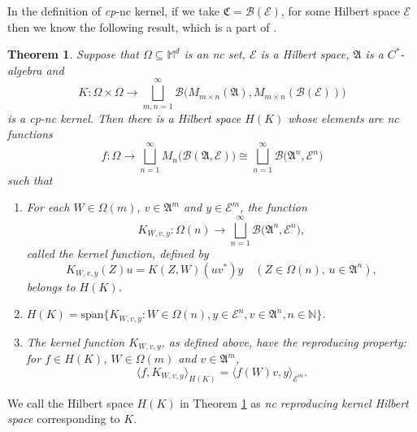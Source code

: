 \documentclass[12pt]{amsart}%
\newtheorem{theorem}{Theorem}[section]
\numberwithin{equation}{section}
\newcommand{\cB}{\mathcal{B}}
\newcommand{\cE}{\mathcal{E}}
\newcommand{\bM}{\mathbb{M}}
\newcommand{\bN}{\mathbb{N}}
\newcommand{\fA}{{\mathfrak{A}}}
\newcommand{\fC}{{\mathfrak{C}}}
\newcommand{\clb}{\mathcal{B}}
\begin{document}
In the definition of \textit{cp}-nc kernel, if we take $\fC=\clb(\cE)$, for some Hilbert space $\cE$ then we know the following result, which is a part of \cite[Theorem 3.1]{BMV16}.
\begin{theorem}\label{rkhs}
    Suppose that $\Omega\subseteq \bM^d$ is an nc set, $\cE$ is a Hilbert space, $\fA$ is a $C^*$-algebra and 
    \[
    K:\Omega\times\Omega\to\bigsqcup_{m,n=1}^{\infty} \cB\big(M_{m\times n}(\fA), M_{m\times n}(\cB(\cE))\big) 
    \]
    is a \textit{cp}-nc kernel. Then there is a Hilbert space $H(K)$ whose elements are nc functions 
    \[
    f:\Omega\to\bigsqcup_{n=1}^{\infty} M_n\big(\cB(\fA, \cE)\big)\cong\bigsqcup_{n=1}^{\infty} \cB\big(\fA^n, \cE^n\big)
    \]
    such that
    \begin{enumerate}
        \item For each $W\in\Omega(m)$, $v\in\fA^{m}$ and $y\in\cE^m$, the function
        \[
        K_{W,v,y}:\Omega(n)\to \bigsqcup_{n=1}^{\infty} \cB\big(\fA^n, \cE^n\big),
        \]
     called the kernel function, defined by
        \[
        K_{W,v,y}(Z)u=K(Z,W)(uv^*)y\quad (Z\in\Omega(n),\, u\in\fA^n),
        \]
        belongs to $H(K)$.

        \vspace{0.1cm}

        \item $H(K)=\overline{\text{span}}\{K_{W,v,y}: W\in\Omega(n), y\in\cE^n, v\in\fA^n, n\in \bN\}$.

\vspace{0.1cm}

        \item The kernel function $K_{W,v,y}$, as defined above, have the reproducing property: for $f\in H(K)$, $W\in\Omega(m)$ and $v\in\fA^m$,
        \[
        \big\langle f, K_{W,v,y}\big\rangle_{H(K)}=\big\langle f(W)v,y\big\rangle_{\cE^m}.
        \]
    \end{enumerate}
\end{theorem}
 
We call the Hilbert space $H(K)$ in Theorem \ref{rkhs} as \textit{nc reproducing kernel Hilbert space} corresponding to $K$. 
\end{document}
